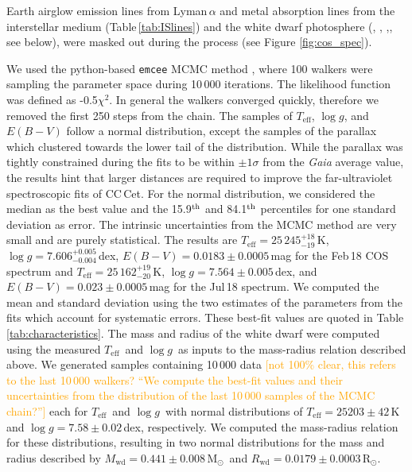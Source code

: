 \documentclass[fleqn,usenatbib]{mnras}
\newcommand{\Rwd}{\mbox{$R_{\mathrm{wd}}$}}
\newcommand{\Mwd}{\mbox{$M_{\mathrm{wd}}$}}
\newcommand{\Msun}{\mbox{$\mathrm{M}_{\odot}$}}
\newcommand{\Rsun}{\mbox{$\mathrm{R}_{\odot}$}}
\newcommand{\Teff}{\mbox{$T_{\mathrm{eff}}$}}
\newcommand{\logg}{\mbox{$\log g$}}
\newcommand{\bgc}[1]{\textcolor{orange}{[#1]}}
\begin{document}
Earth airglow emission lines from Lyman\,$\alpha$ and metal absorption lines from the interstellar medium (Table\,\ref{tab:ISlines}) and the white dwarf photosphere (, , ,, see below), were masked out during the process (see Figure \ref{fig:cos_spec}).

We used the python-based \texttt{emcee} MCMC method \citep{foreman-mackeyetal13-1}, where 100 walkers were sampling the parameter space during 10\,000 iterations. The likelihood function was defined as -0.5$\chi^{2}$. In general the walkers converged quickly, therefore we removed the first 250 steps from the chain. The samples of \Teff, \logg, and $E(B-V)$ follow a normal distribution, except the samples of the parallax which clustered towards the lower tail of the distribution. While the parallax was tightly constrained during the fits to be within $\pm1\sigma$ from the \textit{Gaia} average value, the results hint that larger distances are required to improve the far-ultraviolet spectroscopic fits of CC\,Cet. For the normal distribution, we considered the median as the best value and the 15.9$^{\rm th}$ and 84.1$^{\rm th}$ percentiles for one standard deviation as error. The intrinsic uncertainties from the MCMC method are very small and are purely statistical. The results are $\Teff=25\,245^{+18}_{-19}$\,K, $\logg=7.606^{+0.005}_{-0.004}$\,dex, $E(B-V) = 0.0183\pm0.0005$\,mag for the Feb\,18 COS spectrum and $\Teff=25\,162^{+19}_{-20}$\,K, $\logg=7.564\pm0.005$\,dex, and $E(B-V) =0.023\pm0.0005$\,mag for the Jul\,18 spectrum. We computed the mean and standard deviation using the two estimates of the parameters from the fits which account for systematic errors. These best-fit values are quoted in Table \ref{tab:characteristics}. The mass and radius of the white dwarf were computed using the measured \Teff\ and \logg\ as inputs to the  mass-radius relation described above. We generated samples containing 10\,000 data \bgc{not 100\% clear, this refers to the last 10\,000 walkers? ``We compute the best-fit values and their uncertainties from the distribution of the last 10\,000 samples of the MCMC chain?''} each for \Teff\ and \logg\  with normal distributions of $\Teff=25203\pm42$\,K and $\logg=7.58\pm0.02$\,dex, respectively. We computed the mass-radius relation for these distributions, resulting in two normal distributions for the mass and radius described by  $\Mwd=0.441\pm0.008$\,\Msun\ and $\Rwd=0.0179\pm0.0003$\,\Rsun.


\end{document}

